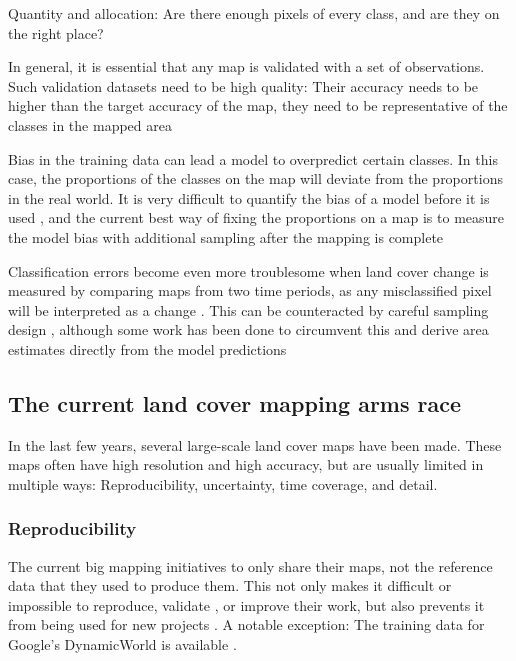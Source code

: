        Quantity and allocation: Are there enough pixels of every class, and are they on the right place? \citep{pontius2006can,pontius2011death}

        In general, it is essential that any map is validated with a set of observations. Such validation datasets need to be high quality: Their accuracy needs to be higher than the target accuracy of the map, they need to be representative of the classes in the mapped area 
    
        Bias in the training data can lead a model to overpredict certain classes. In this case, the proportions of the classes on the map will deviate from the proportions in the real world. It is very difficult to quantify the bias of a model before it is used \citep{stehman2013estimating}, and the current best way of fixing the proportions on a map is to measure the model bias with additional sampling after the mapping is complete \citep{stehman2014estimating}

        Classification errors become even more troublesome when land cover change is measured by comparing maps from two time periods, as any misclassified pixel will be interpreted as a change \citep{olofsson2013making}. This can be counteracted by careful sampling design \citep{stehman2012impact,olofsson2014good}, although some work has been done to circumvent this and derive area estimates directly from the model predictions \citep{sales2022land}
    
\subsection*{The current land cover mapping arms race}
    
    In the last few years, several large-scale land cover maps have been made.
    These maps often have high resolution and high accuracy, but are usually limited in multiple ways: Reproducibility, uncertainty, time coverage, and detail.
    
    \subsubsection{Reproducibility}
        The current big mapping initiatives to only share their maps, not the reference data that they used to produce them. This not only makes it difficult or impossible to reproduce, validate \citep{venter2022global}, or improve their work, but also prevents it from being used for new projects \citep{tsendbazar2015assessing}.  A notable exception: The training data for Google's DynamicWorld \citet{brown2022dynamic} is available \citep{tait2021dwtd}.
    
